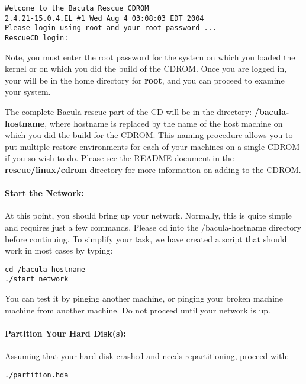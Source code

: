 \footnotesize
\begin{verbatim}
Welcome to the Bacula Rescue CDROM
2.4.21-15.0.4.EL #1 Wed Aug 4 03:08:03 EDT 2004
Please login using root and your root password ...
RescueCD login:
\end{verbatim}
\normalsize

Note, you must enter the root password for the system on which you loaded the
kernel or on which you did the build of the CDROM. Once you are logged in,
your will be in the home directory for {\bf root}, and you can proceed to
examine your system. 

The complete Bacula rescue part of the CD will be in the directory: {\bf
/bacula-hostname}, where hostname is replaced by the name of the host machine
on which you did the build for the CDROM. This naming procedure allows you to
put multiple restore environments for each of your machines on a single CDROM
if you so wish to do. Please see the README document in the {\bf
rescue/linux/cdrom} directory for more information on adding to the CDROM. 

\paragraph*{Start the Network:}

At this point, you should bring up your network. Normally, this is quite
simple and requires just a few commands. Please cd into the /bacula-hostname
directory before continuing. To simplify your task, we have created a script
that should work in most cases by typing: 

\footnotesize
\begin{verbatim}
cd /bacula-hostname
./start_network
\end{verbatim}
\normalsize

You can test it by pinging another machine, or pinging your broken machine
machine from another machine. Do not proceed until your network is up. 

\paragraph*{Partition Your Hard Disk(s):}

Assuming that your hard disk crashed and needs repartitioning, proceed with: 

\footnotesize
\begin{verbatim}
./partition.hda
\end{verbatim}
\normalsize

